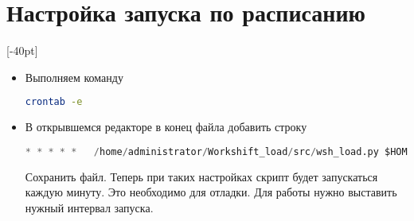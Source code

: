 \section{Настройка запуска по расписанию}
[-40pt]

\begin{itemize}
	\item  Выполняем команду
	\begin{tcolorbox}
		
		\begin{lstlisting}[language=bash]
crontab -e
		\end{lstlisting}
	\end{tcolorbox}
	
	\item В открывшемся редакторе в конец файла добавить строку
	\begin{tcolorbox}
		
		\begin{lstlisting}[language=Python,basicstyle= \footnotesize]
* * * * *   /home/administrator/Workshift_load/src/wsh_load.py $HOME/command.log  2>&1
		\end{lstlisting}
	\end{tcolorbox}
	
	Сохранить файл. Теперь при таких настройках скрипт будет запускаться каждую минуту. Это необходимо для отладки. Для работы нужно выставить нужный интервал запуска.
	
\end{itemize}
